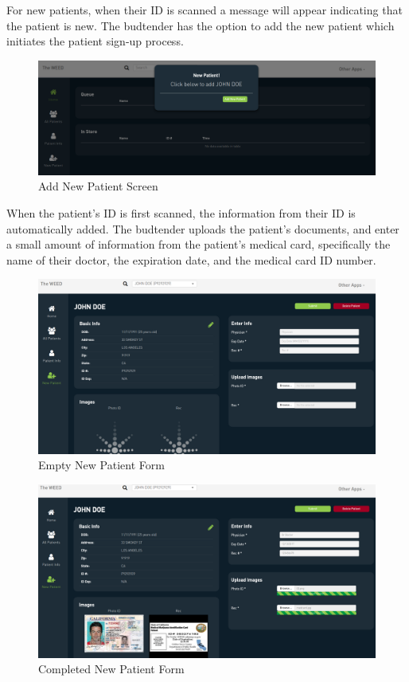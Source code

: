 \documentclass[]{book}
\theoremstyle{definition}
\theoremstyle{definition}
\theoremstyle{definition}
\theoremstyle{remark}
\begin{document}
For new patients, when their ID is scanned a message will appear
indicating that the patient is new. The budtender has the option to add
the new patient which initiates the patient sign-up process.

\begin{figure}
\centering
\includegraphics{images/addnew.png}
\caption{Add New Patient Screen}
\end{figure}

When the patient's ID is first scanned, the information from their ID is
automatically added. The budtender uploads the patient's documents, and
enter a small amount of information from the patient's medical card,
specifically the name of their doctor, the expiration date, and the
medical card ID number.

\begin{figure}
\centering
\includegraphics{images/NewPatient.png}
\caption{Empty New Patient Form}
\end{figure}

\begin{figure}
\centering
\includegraphics{images/newPatient2.png}
\caption{Completed New Patient Form}
\end{figure}
\end{document}
